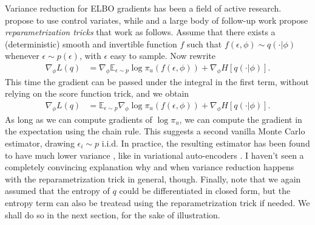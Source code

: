 Variance reduction for ELBO gradients has been a field of active research.
\cite{PaBlJo12} propose to use control variates, while \cite{KiWe14} and a large body of follow-up work propose \emph{reparametrization tricks} that work as follows. 
Assume that there exists a (deterministic) smooth and invertible function $f$ such that $f(\epsilon,\phi)\sim q(\cdot\vert\phi)$ whenever $\epsilon\sim p(\epsilon)$, with $\epsilon$ easy to sample.
Now rewrite 
\begin{align*}
  \nabla_\phi L(q) 
  &= \nabla_\phi \mathbb{E}_{\epsilon\sim p} \log \pi_u(f(\epsilon,\phi)) + \nabla_\phi H[q(\cdot\vert\phi)].
\end{align*}
This time the gradient can be passed under the integral in the first term, without relying on the score function trick, and we obtain
\begin{align*}
  \nabla_\phi L(q) 
  &= \mathbb{E}_{\epsilon\sim p} \nabla_\phi \log \pi_u(f(\epsilon,\phi)) + \nabla_\phi H[q(\cdot\vert\phi)].
\end{align*}
As long as we can compute gradients of $\log\pi_u$, we can compute the gradient in the expectation using the chain rule. 
This suggests a second vanilla Monte Carlo estimator, drawing $\epsilon_i\sim p$ i.i.d. 
In practice, the resulting estimator has been found to have much lower variance \citep{ReMoWi14}, like in variational auto-encoders \citep{KiWe14}. 
I haven't seen a completely convincing explanation why and when variance reduction happens with the reparametrization trick in general, though.  
Finally, note that we again assumed that the entropy of $q$ could be differentiated in closed form, but the entropy term can also be treatead using the reparametrization trick if needed. 
We shall do so in the next section, for the sake of illustration.

